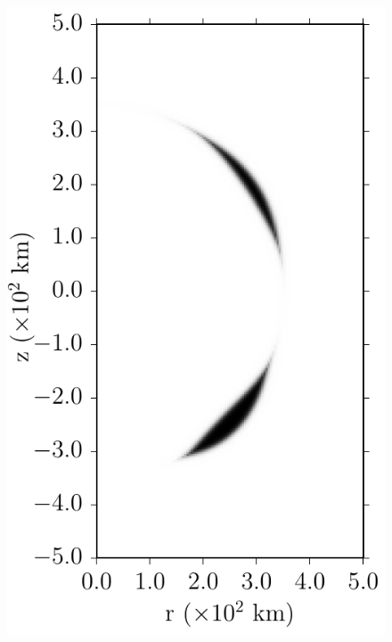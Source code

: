 \documentclass[iop,apj]{emulateapj}
\begin{document}
\begin{figure}[ht]
\begin{minipage}{0.24\textwidth}
    \includegraphics[width=\linewidth]{figures/cf_initcond_rhoddt-7.2/profile75_mpole-4_r-35e6_a-24e5_init.pdf}
  \end{minipage} \hfill 
  \begin{minipage}{0.24\textwidth}

\end{minipage}
\end{figure}
\end{document}
